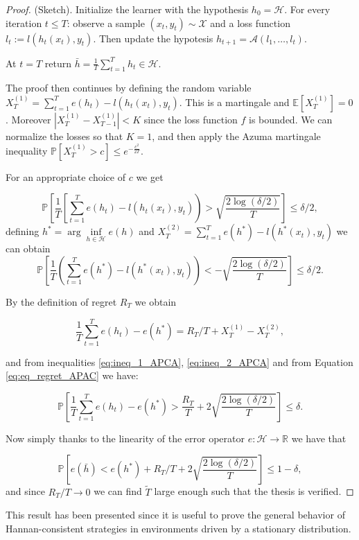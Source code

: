 \begin{proof}(Sketch).
Initialize the learner with the hypothesis $h_0=\mathcal H$.
For every iteration $t\le T$: observe a sample $(x_t,y_t)\sim\mathcal X$ and a loss function $l_t:=l(h_t(x_t),y_t)$. Then update the hypotesis $h_{t+1}=\mathcal A(l_1,\ldots,l_t)$.

At $t=T$ return $\bar{h}=\frac{1}{T}\sum\limits_{t=1}^T h_t\in\mathcal H$. 

The proof then continues by defining the random variable $X^{(1)}_T=\sum\limits_{t=1}^Te(h_t)-l(h_t(x_t),y_t)$. This is a martingale and $\mathbb E[X^{(1)}_T]=0$. Moreover $|X^{(1)}_T-X^{(1)}_{T-1}|<K$ since the loss function $f$ is bounded. We can normalize the losses so that $K=1$, and then apply the Azuma martingale  inequality $\mathbb P[X^{(1)}_T>c]\le e^{-\frac{c^2}{2T}}$.

For an appropriate choice of $c$ we get

\begin{equation}\label{eq:ineq_1_APCA}
\mathbb P\left[\frac{1}{T}\left[\sum\limits_{t=1}^Te(h_t)-l(h_t(x_t),y_t)\right)>\sqrt{\frac{2\log(\delta/2)}{T}}\right]\le \delta/2,
\end{equation}
defining $h^*=\arg\inf\limits_{h\in\mathcal H} e(h)$ and $X^{(2)}_T=\sum\limits_{t=1}^Te(h^*)-l(h^*(x_t),y_t)$ we can obtain
\begin{equation}\label{eq:ineq_2_APCA}
\mathbb P\left[\frac{1}{T}\left(\sum\limits_{t=1}^Te(h^*)-l(h^*(x_t),y_t)\right)<-\sqrt{\frac{2\log(\delta/2)}{T}}\right]\le \delta/2.
\end{equation}

By the definition of regret $R_T$ we obtain

\begin{equation}\label{eq:eq_regret_APAC}
\frac{1}{T}\sum\limits_{t=1}^Te(h_t)-e(h^*)=R_T/T+X_T^{(1)}-X_T^{(2)},
\end{equation}

and from inequalities \eqref{eq:ineq_1_APCA}, \eqref{eq:ineq_2_APCA} and from Equation \eqref{eq:eq_regret_APAC} we have:

\begin{equation}
\mathbb P\left[\frac{1}{T}\sum\limits_{t=1}^Te(h_t)-e(h^*)>\frac{R_T}{T}+2\sqrt{\frac{2\log(\delta/2)}{T}}\right]\le \delta.
\end{equation}

Now simply thanks to the linearity of the error operator $e:\mathcal H\to \mathbb R$ we have that 

$$\mathbb P\left[e(\bar h)<e(h^*)+R_T/T+2\sqrt{\frac{2\log(\delta/2)}{T}}\right]\le 1-\delta,$$
and since $R_T/T\to0$ we can find $\tilde T$ large enough such that the thesis is verified.
\end{proof}

This result has been presented since it is useful to prove the general behavior of Hannan-consistent strategies in environments driven by a stationary distribution.